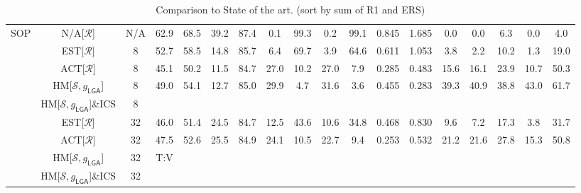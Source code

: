 \begin{table*}
{\begin{tabular}{c|cc|cccc|ccccc|ccccc|c}
\multirow{9}{*}{SOP} & N/A{[}$\mathcal{R}${]} & N/A & 62.9 & 68.5 & 39.2 & 87.4 & 0.1 & 99.3 & 0.2 & 99.1 & 0.845 & 1.685 & 0.0 & 0.0 & 6.3 & 0.0 & 4.0\tabularnewline
\cline{2-18} \cline{3-18} \cline{4-18} \cline{5-18} \cline{6-18} \cline{7-18} \cline{8-18} \cline{9-18} \cline{10-18} \cline{11-18} \cline{12-18} \cline{13-18} \cline{14-18} \cline{15-18} \cline{16-18} \cline{17-18} \cline{18-18}
 & EST{[}$\mathcal{R}${]} & 8 & 52.7 & 58.5 & 14.8 & 85.7 & 6.4 & 69.7 & 3.9 & 64.6 & 0.611 & 1.053 & 3.8 & 2.2 & 10.2 & 1.3 & 19.0\tabularnewline
 & ACT{[}$\mathcal{R}${]} & 8 & 45.1 & 50.2 & 11.5 & 84.7 & 27.0 & 10.2 & 27.0 & 7.9 & 0.285 & 0.483 & 15.6 & 16.1 & 23.9 & 10.7 & 50.3\tabularnewline
 & HM{[}$\mathcal{S},g_{\mathsf{LGA}}${]} & 8 & 49.0 & 54.1 & 12.7 & 85.0 & 29.9 & 4.7 & 31.6 & 3.6 & 0.455 & 0.283 & 39.3 & 40.9 & 38.8 & 43.0 & 61.7\tabularnewline
 & HM{[}$\mathcal{S},g_{\mathsf{LGA}}${]}\&ICS & 8 &  &  &  &  &  &  &  &  &  &  &  &  &  &  & \tabularnewline
\cline{2-18} \cline{3-18} \cline{4-18} \cline{5-18} \cline{6-18} \cline{7-18} \cline{8-18} \cline{9-18} \cline{10-18} \cline{11-18} \cline{12-18} \cline{13-18} \cline{14-18} \cline{15-18} \cline{16-18} \cline{17-18} \cline{18-18}
 & EST{[}$\mathcal{R}${]} & 32 & 46.0 & 51.4 & 24.5 & 84.7 & 12.5 & 43.6 & 10.6 & 34.8 & 0.468 & 0.830 & 9.6 & 7.2 & 17.3 & 3.8 & 31.7\tabularnewline
 & ACT{[}$\mathcal{R}${]} & 32 & 47.5 & 52.6 & 25.5 & 84.9 & 24.1 & 10.5 & 22.7 & 9.4 & 0.253 & 0.532 & 21.2 & 21.6 & 27.8 & 15.3 & 50.8\tabularnewline
 & HM{[}$\mathcal{S},g_{\mathsf{LGA}}${]} & 32 & T:V &  &  &  &  &  &  &  &  &  &  &  &  &  & \tabularnewline
 & HM{[}$\mathcal{S},g_{\mathsf{LGA}}${]}\&ICS & 32 &  &  &  &  &  &  &  &  &  &  &  &  &  &  & \tabularnewline

	\bottomrule

\end{tabular}}

\caption{Comparison to State of the art. (sort by sum of R1 and ERS)}
	\label{tab:sota}
\end{table*}
